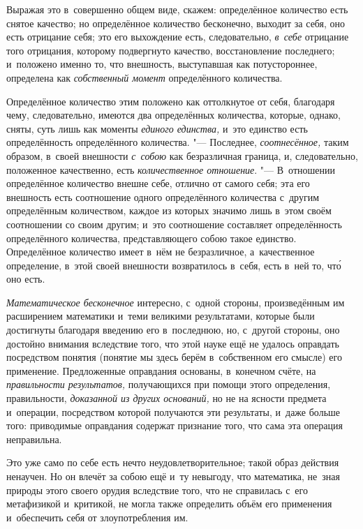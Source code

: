 Выражая это в~совершенно общем виде, скажем: определённое количество есть
снятое качество; но определённое количество бесконечно, выходит за себя, оно
есть отрицание себя; это его выхождение есть, следовательно, {\em в~себе}
отрицание того отрицания, которому подвергнуто качество, восстановление
последнего; и~положено именно то, что внешность, выступавшая как потустороннее,
определена как {\em собственный момент} определённого количества.

Определённое количество этим положено как оттолкнутое от себя, благодаря чему,
следовательно, имеются два определённых количества, которые, однако, сняты,
суть лишь как моменты {\em единого единства,} и~это единство есть
определённость определённого количества. "--- Последнее, {\em соотнесённое,}
таким образом, в~своей внешности {\em с~собою} как безразличная граница, и,
следовательно, положенное качественно, есть {\em количественное отношение}.
"--- В~отношении определённое количество внешне себе, отлично от самого себя;
эта его внешность есть соотношение одного определённого количества с~другим
определённым количеством, каждое из которых значимо лишь в~этом своём
соотношении со своим другим; и~это соотношение составляет определённость
определённого количества, представляющего собою такое единство. Определённое
количество имеет в~нём не безразличное, а~качественное определение, в~этой
своей внешности возвратилось в~себя, есть в~ней то, чт\'{о} оно есть.


{\em Математическое бесконечное} интересно, с~одной стороны, произведённым им
расширением математики и~теми великими результатами, которые были достигнуты
благодаря введению его в~последнюю, но, с~другой стороны, оно достойно внимания
вследствие того, что этой науке ещё не удалось оправдать посредством понятия
(понятие мы здесь берём в~собственном его смысле) его применение. Предложенные
оправдания основаны, в~конечном счёте, на {\em правильности результатов,}
получающихся при помощи этого определения, правильности,
{\em доказанной из других оснований,} но не на ясности предмета и~операции,
посредством которой получаются эти результаты, и~даже больше того: приводимые
оправдания содержат признание того, что сама эта операция неправильна.

Это уже само по себе есть нечто неудовлетворительное; такой образ действия
ненаучен. Но он влечёт за собою ещё и~ту невыгоду, что математика, не~зная
природы этого своего орудия вследствие того, что не справилась с~его
метафизикой и~критикой, не могла также определить объём его применения
и~обеспечить себя от злоупотребления им.

